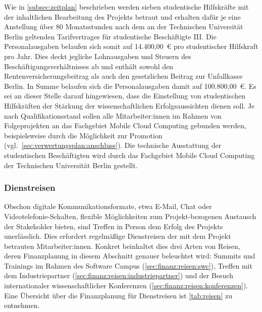 Wie in \cref{subsec:zeitplan} beschrieben werden sieben studentische Hilfskräfte mit der inhaltlichen Bearbeitung des Projekts betraut und erhalten dafür je eine Anstellung über 80 Monatsstunden nach dem an der Technischen Universität Berlin geltenden Tarifvertrages für studentische Beschäftigte \textrm{III}.
Die Personalausgaben belaufen sich somit auf 14.400,00~€ pro studentischer Hilfskraft pro Jahr.
Dies deckt jegliche Lohnausgaben und Steuern des Beschäftigungsverhältnisses ab und enthält sowohl den Rentenversicherungsbeitrag als auch den gesetzlichen Beitrag zur Unfallkasse Berlin.
In Summe belaufen sich die Personalausgaben damit auf 100.800,00~€.
Es sei an dieser Stelle darauf hingewiesen, dass die Einstellung von studentischen Hilfskräften der Stärkung der wissenschaftlichen Erfolgsaussichten dienen soll.
Je nach Qualifikationsstand sollen alle Mitarbeiter:innen im Rahmen von Folgeprojekten an das Fachgebiet Mobile Cloud Computing gebunden werden, beispielsweise durch die Möglichkeit zur Promotion (vgl.~\cref{sec:verwertungsplan:anschluss}).
Die technische Ausstattung der studentischen Beschäftigten wird durch das Fachgebiet Mobile Cloud Computing der Technischen Universität Berlin gestellt.

\subsubsection{Dienstreisen}
\label{sec:finanz:reisen}



Obschon digitale Kommunikationsformate, etwa E-Mail, Chat oder Videotelefonie-Schalten, flexible Möglichkeiten zum Projekt-bezogenen Austausch der Stakeholder bieten, sind Treffen in Person dem Erfolg des Projekts unerlässlich.
Dies erfordert regelmäßige Dienstreisen der mit dem Projekt betrauten Mitarbeiter:innen.
Konkret beinhaltet dies drei Arten von Reisen, deren Finanzplanung in diesem Abschnitt genauer beleuchtet wird: Summits und Trainings im Rahmen des Software Campus (\cref{sec:finanz:reisen:swc}), Treffen mit dem Industriepartner (\cref{sec:finanz:reisen:industriepartner}) und der Besuch internationaler wissenschaftlicher Konferenzen (\cref{sec:finanz:reisen:konferenzen}).
Eine Übersicht über die Finanzplanung für Dienstreisen ist \cref{tab:reisen} zu entnehmen.


